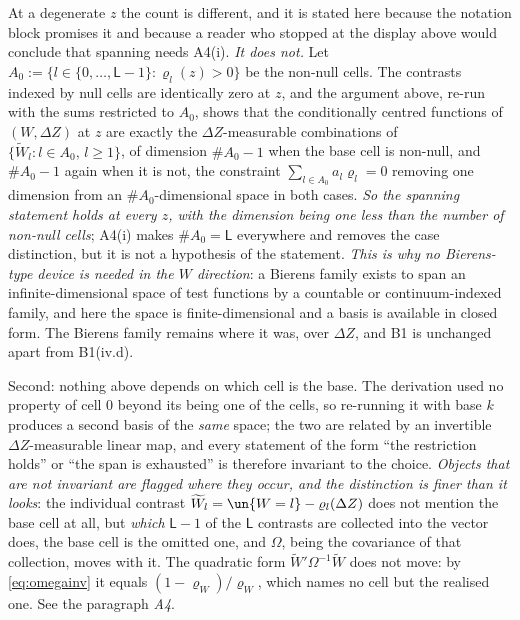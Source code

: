 At a degenerate $z$ the count is different, and it is stated here because the notation block
promises it and because a reader who stopped at the display above would conclude that spanning needs
A4(i). \emph{It does not.} Let $A_0:=\{l\in\{0,\dots,\mathsf L-1\}:\varrho_l(z)>0\}$ be the non-null
cells. The contrasts indexed by null cells are identically zero at $z$, and the argument above, re-run
with the sums restricted to $A_0$, shows that the conditionally centred functions of $(W,\Delta Z)$ at
$z$ are exactly the $\Delta Z$-measurable combinations of $\{\widetilde W_l:l\in A_0,\,l\ge1\}$, of
dimension $\#A_0-1$ when the base cell is non-null, and $\#A_0-1$ again when it is not, the
constraint $\sum_{l\in A_0}a_l\varrho_l=0$ removing one dimension from an $\#A_0$-dimensional space in
both cases. \emph{So the spanning statement holds at every $z$, with the dimension being one less than
the number of non-null cells}; A4(i) makes $\#A_0=\mathsf L$ everywhere and removes the case
distinction, but it is not a hypothesis of the statement. \emph{This is why no
Bierens-type device is needed in the $W$ direction}: a Bierens family exists to span an
infinite-dimensional space of test functions by a countable or continuum-indexed family, and here the
space is finite-dimensional and a basis is available in closed form. The Bierens family remains where it
was, over $\Delta Z$, and B1 is unchanged apart from B1(iv.d).

Second: nothing above depends on which cell is the base. The derivation used no property of cell
$0$ beyond its being one of the cells, so re-running it with base $k$ produces a second basis of the
\emph{same} space; the two are related by an invertible $\Delta Z$-measurable linear map, and every
statement of the form ``the restriction holds'' or ``the span is exhausted'' is therefore invariant to
the choice. \emph{Objects that are not invariant are flagged where they occur, and the distinction is
finer than it looks}: the individual contrast $\widetilde W_l=\un\{W=l\}-\varrho_l(\Delta Z)$ does not
mention the base cell at all, but \emph{which} $\mathsf L-1$ of the $\mathsf L$ contrasts are collected
into the vector does, the base cell is the omitted one, and $\Omega$, being the covariance of that
collection, moves with it. The quadratic form $\widetilde W'\Omega^{-1}\widetilde W$ does not move: by
\eqref{eq:omegainv} it equals $(1-\varrho_W)/\varrho_W$, which names no cell but the realised one. See
the paragraph \emph{A4}.

